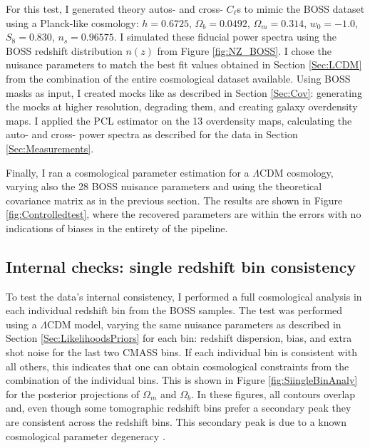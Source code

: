 For this test, I generated theory autos- and cross- $C_{\ell}$s to mimic the BOSS dataset using a Planck-like cosmology: $h = 0.6725$, $\Omega_b = 0.0492$, $\Omega_{m} = 0.314$, $w_0 = -1.0$, $S_8 = 0.830$, $n_s = 0.96575$. I simulated these fiducial power spectra using the BOSS redshift distribution $n(z)$ from Figure \ref{fig:NZ_BOSS}. I chose the nuisance parameters to match the best fit values obtained in Section \ref{Sec:LCDM} from the combination of the entire cosmological dataset available. Using BOSS masks as input, I created \flask mocks like as described in Section \ref{Sec:Cov}: generating the mocks at higher resolution, degrading them, and creating galaxy overdensity maps. I applied the PCL estimator on the 13 overdensity maps, calculating the auto- and cross- power spectra as described for the data in Section \ref{Sec:Measurements}.

\qquad Finally, I ran a cosmological parameter estimation for a $\Lambda$CDM cosmology, varying also the 28 BOSS nuisance parameters and using the theoretical covariance matrix as in the previous section. The results are shown in Figure \ref{fig:Controlledtest}, where the recovered parameters are within the errors with no indications of biases in the entirety of the pipeline. 

\subsection{Internal checks: single redshift bin consistency}
To test the data's internal consistency, I performed a full cosmological analysis in each individual redshift bin from the BOSS samples. The test was performed using a $\Lambda$CDM model, varying the same nuisance parameters as described in Section \ref{Sec:LikelihoodsPriors} for each bin: redshift dispersion, bias, and extra shot noise for the last two CMASS bins. If each individual bin is consistent with all others, this indicates that one can obtain cosmological constraints from the combination of the individual bins. This is shown in Figure \ref{fig:SiingleBinAnaly} for the posterior projections of $\Omega_m$ and $\Omega_b$. In these figures, all contours overlap and, even though some tomographic redshift bins prefer a secondary peak they are consistent across the redshift bins. This secondary peak is due to a known cosmological parameter degeneracy \citep{2001Percival}.

